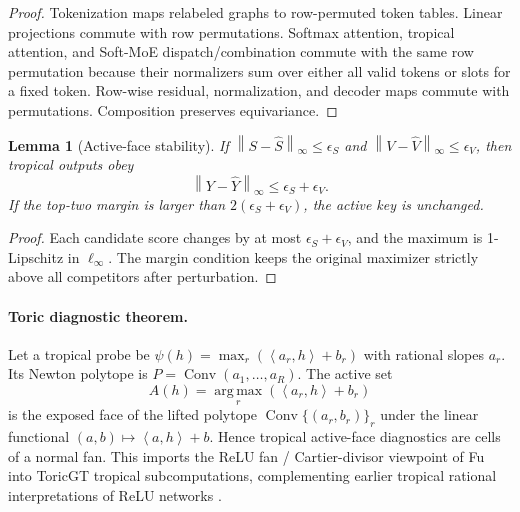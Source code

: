 \documentclass[10pt]{article}
\theoremstyle{definition}
\theoremstyle{plain}
\newtheorem{lemma}[definition]{Lemma}
\theoremstyle{remark}
\newcommand{\argmax}{\operatorname*{arg\,max}}
\newcommand{\Conv}{\operatorname{Conv}}
\newcommand{\norm}[1]{\left\lVert #1\right\rVert}
\newcommand{\ip}[2]{\left\langle #1,#2\right\rangle}
\begin{document}
\begin{proof}
Tokenization maps relabeled graphs to row-permuted token tables.  Linear projections commute with row permutations.  Softmax attention, tropical attention, and Soft-MoE dispatch/combination commute with the same row permutation because their normalizers sum over either all valid tokens or slots for a fixed token.  Row-wise residual, normalization, and decoder maps commute with permutations.  Composition preserves equivariance.
\end{proof}

\begin{lemma}[Active-face stability]
If $\norm{S-\widehat S}_\infty\le\epsilon_S$ and $\norm{V-\widehat V}_\infty\le\epsilon_V$, then tropical outputs obey
\begin{equation}
  \norm{Y-\widehat Y}_\infty\le\epsilon_S+\epsilon_V.
\end{equation}
If the top-two margin is larger than $2(\epsilon_S+\epsilon_V)$, the active key is unchanged.
\end{lemma}

\begin{proof}
Each candidate score changes by at most $\epsilon_S+\epsilon_V$, and the maximum is 1-Lipschitz in $\ell_\infty$.  The margin condition keeps the original maximizer strictly above all competitors after perturbation.
\end{proof}

\paragraph{Toric diagnostic theorem.}
Let a tropical probe be $\psi(h)=\max_r(\ip{a_r}{h}+b_r)$ with rational slopes $a_r$.  Its Newton polytope is $P=\Conv(a_1,\ldots,a_R)$.  The active set
\begin{equation}
  A(h)=\argmax_r(\ip{a_r}{h}+b_r)
\end{equation}
is the exposed face of the lifted polytope $\Conv\{(a_r,b_r)\}_r$ under the linear functional $(a,b)\mapsto\ip{a}{h}+b$.  Hence tropical active-face diagnostics are cells of a normal fan.  This imports the ReLU fan / Cartier-divisor viewpoint of Fu \cite{fu2025toricrelu} into ToricGT tropical subcomputations, complementing earlier tropical rational interpretations of ReLU networks \cite{zhang2018tropical}.
\end{document}
